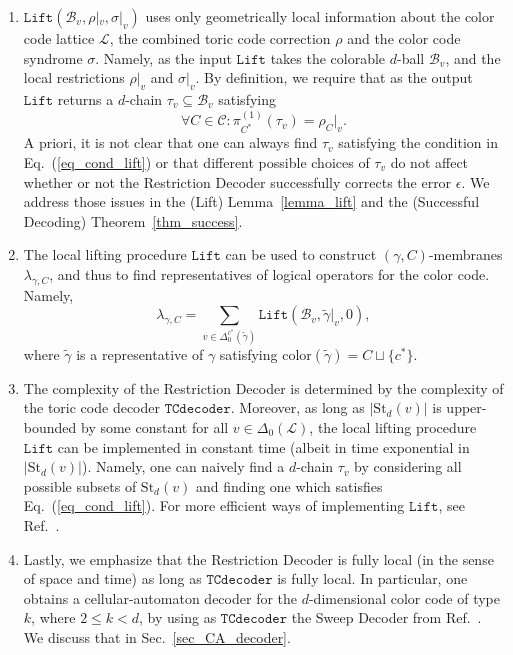 \documentclass[onecolumn,letterpaper,11pt,accepted=2022-12-19]{quantumarticle}
\newcommand{\face}[2]{{\Delta_{#1}(#2)}}
\newcommand{\facex}[3]{{\Delta^{#1}_{#2}(#3)}}
\renewcommand{\star}[2]{{\mathrm{St}_{#1}(#2)}}
\newcommand{\rest}[1]{|_{#1}}
\newcommand{\col}[1]{{\mathrm{color}(#1)}}
\theoremstyle{definition}
\theoremstyle{lemma}
\theoremstyle{theorem}
\theoremstyle{corollary}
\begin{document}
{\begin{enumerate}
\item[(ii)] $\texttt{Lift}(\mathcal{B}_v,\rho\rest v, \sigma\rest v)$ uses only geometrically local information about the color code lattice $\mathcal{L}$, the combined toric code correction $\rho$ and the color code syndrome $\sigma$.
Namely, as the input $\texttt{Lift}$ takes the colorable $d$-ball $\mathcal{B}_v$, and the local restrictions $\rho\rest v$ and $\sigma\rest v$.
By definition, we require that as the output $\texttt{Lift}$ returns a $d$-chain $\tau_v \subseteq \mathcal{B}_v$ satisfying
\begin{equation}
\label{eq_cond_lift}
\forall C\in\mathcal{C}: \pi^{(1)}_{C^*} (\tau_v) = \rho_C\rest v.
\end{equation}
A priori, it is not clear that one can always find $\tau_v$ satisfying the condition in Eq.~(\ref{eq_cond_lift}) or that different possible choices of $\tau_v$ do not affect whether or not the Restriction Decoder successfully corrects the error $\epsilon$.
We address those issues in the (Lift) Lemma~\ref{lemma_lift} and the (Successful Decoding) Theorem~\ref{thm_success}.

\item[(iii)] The local lifting procedure $\texttt{Lift}$ can be used to construct $(\gamma,C)$-membranes $\lambda_{\gamma,C}$, and thus to find representatives of logical operators for the color code.
Namely,
\begin{equation}
\lambda_{\gamma,C} = \sum_{v\in\facex{c^*} 0 {\widetilde\gamma}} \mathtt{Lift}(\mathcal{B}_v,\widetilde\gamma\rest v, 0),
\end{equation}
where $\widetilde\gamma$ is a representative of $\gamma$ satisfying $\col{\widetilde\gamma} = C \sqcup \{ c^* \}$.

\item[(iv)] The complexity of the Restriction Decoder is determined by the complexity of the toric code decoder $\texttt{TCdecoder}$.
Moreover, as long as $| \star d v |$ is upper-bounded by some constant for all $v\in\face 0 {\mathcal{L}}$, the local lifting procedure $\texttt{Lift}$ can be implemented in constant time (albeit in time exponential in $| \star d v |$).
Namely, one can naively find a $d$-chain $\tau_v$ by considering all possible subsets of $\star d v$ and finding one which satisfies Eq.~(\ref{eq_cond_lift}).
For more efficient ways of implementing $\texttt{Lift}$, see Ref.~\cite{Kubicathesis}.

\item[(v)] Lastly, we emphasize that the Restriction Decoder is fully local (in the sense of space and time) as long as $\texttt{TCdecoder}$ is fully local.
In particular, one obtains a cellular-automaton decoder for the $d$-dimensional color code of type $k$, where $2\leq k < d$, by using as $\texttt{TCdecoder}$ the Sweep Decoder from Ref.~\cite{Kubica2018toom}.
We discuss that in Sec.~\ref{sec_CA_decoder}.
\end{enumerate}


}
\end{document}
